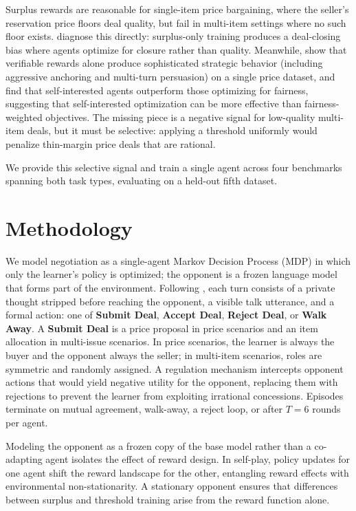 \documentclass[11pt]{article}
\begin{document}
Surplus rewards are reasonable for single-item price bargaining, where the seller's reservation price floors deal quality, but fail in multi-item settings where no such floor exists. \citet{bergemann2026bilateral} diagnose this directly: surplus-only training produces a deal-closing bias where agents optimize for closure rather than quality. Meanwhile, \citet{liu2026instructing} show that verifiable rewards alone produce sophisticated strategic behavior (including aggressive anchoring and multi-turn persuasion) on a single price dataset, and \citet{chawla2023selfish} find that self-interested agents outperform those optimizing for fairness, suggesting that self-interested optimization can be more effective than fairness-weighted objectives. The missing piece is a negative signal for low-quality multi-item deals, but it must be selective: applying a threshold uniformly would penalize thin-margin price deals that are rational.

We provide this selective signal and train a single agent across four benchmarks spanning both task types, evaluating on a held-out fifth dataset.

\section{Methodology}

We model negotiation as a single-agent Markov Decision Process (MDP) in which only the learner's policy is optimized; the opponent is a frozen language model that forms part of the environment. Following \citet{he2018decoupling}, each turn consists of a private thought stripped before reaching the opponent, a visible talk utterance, and a formal action: one of \textbf{Submit Deal}, \textbf{Accept Deal}, \textbf{Reject Deal}, or \textbf{Walk Away}. A \textbf{Submit Deal} is a price proposal in price scenarios and an item allocation in multi-issue scenarios. In price scenarios, the learner is always the buyer and the opponent always the seller; in multi-item scenarios, roles are symmetric and randomly assigned. A regulation mechanism intercepts opponent actions that would yield negative utility for the opponent, replacing them with rejections to prevent the learner from exploiting irrational concessions. Episodes terminate on mutual agreement, walk-away, a reject loop, or after $T{=}6$ rounds per agent.

Modeling the opponent as a frozen copy of the base model rather than a co-adapting agent isolates the effect of reward design. In self-play, policy updates for one agent shift the reward landscape for the other, entangling reward effects with environmental non-stationarity. A stationary opponent ensures that differences between surplus and threshold training arise from the reward function alone.
\end{document}
